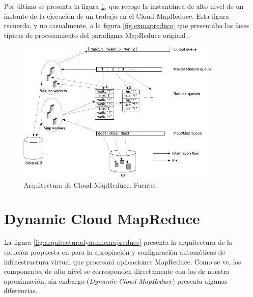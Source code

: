 Por \'ultimo se presenta la figura \ref{fig:arquitecturacloudmapreduce}, que recoge la instant\'anea de alto nivel de un instante de la ejecuci\'on de un trabajo en el Cloud MapReduce. Esta figura recuerda, y no casualmente, a la figura \ref{fig:exmapreduce} que presentaba las fases t\'ipicas de procesamiento del paradigma MapReduce original \cite{googlemapreduce}.

\begin{figure}[tbp]
\begin{center}
\includegraphics[width=0.9\textwidth]{imagenes/036.pdf}
 \caption{Arquitectura de Cloud MapReduce. Fuente: \cite{cloudmapreduce}}
\label{fig:arquitecturacloudmapreduce}
\end{center}
\end{figure}

\section{Dynamic Cloud MapReduce}\label{sec:dynamicmapreduce}
\noindent La figura \ref{fig:arquitecturadynamicmapreduce} presenta la arquitectura de la soluci\'on propuesta en \cite{dynamicmapreduce} para la apropiaci\'on y configuraci\'on autom\'aticas de infraestructura virtual que procesar\'a aplicaciones MapReduce. Como se ve, los componentes de alto nivel se corresponden directamente con los de nuestra aproximaci\'on; sin embargo (\emph{Dynamic Cloud MapReduce}) presenta algunas diferencias.

